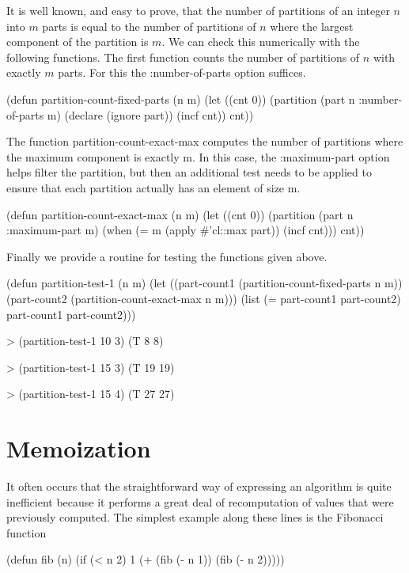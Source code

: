 It is well known, and easy to prove, that the number of partitions of
an integer $n$ into $m$ parts is equal to the number of partitions of
$n$ where the largest component of the partition is $m$. We can check
this numerically with the following functions. The first function
counts the number of partitions of $n$ with exactly $m$ parts. For
this the {\sf :number-of-parts} option suffices.
\begin{code}
(defun partition-count-fixed-parts (n m)
  (let ((cnt 0))
    (partition (part n :number-of-parts m)
      (declare (ignore part))
      (incf cnt))
      cnt))
\end{code}
  
The function {\sf partition-count-exact-max} computes the
number of partitions where the maximum component is
exactly {\sf m}. In this case, the {\sf :maximum-part} option helps
filter the partition, but then an additional test needs
to be applied to ensure that each partition actually
has an element of size {\sf m}.
\begin{code}
(defun partition-count-exact-max (n m)
  (let ((cnt 0))
    (partition (part n :maximum-part m)
      (when (= m (apply #'cl::max part))
        (incf cnt)))
    cnt))
\end{code}
  
Finally we provide a routine for testing the functions given above.
\begin{code}
(defun partition-test-1 (n m)
  (let ((part-count1 (partition-count-fixed-parts n m))
        (part-count2 (partition-count-exact-max n m)))
    (list (= part-count1 part-count2)
          part-count1 part-count2)))
  
> (partition-test-1 10 3)
(T 8 8)

> (partition-test-1 15 3)
(T 19 19)
  
> (partition-test-1 15 4)
(T 27 27)
\end{code}
  
\section{Memoization}
\label{Memoization:Sec}
  
It often occurs that the straightforward way of expressing an
algorithm is quite inefficient because it performs a great deal of
recomputation of values that were previously computed.  The simplest
example along these lines is the Fibonacci function
\begin{code}
(defun fib (n)
  (if (< n 2) 1
      (+ (fib (- n 1)) (fib (- n 2)))))
\end{code}
  
